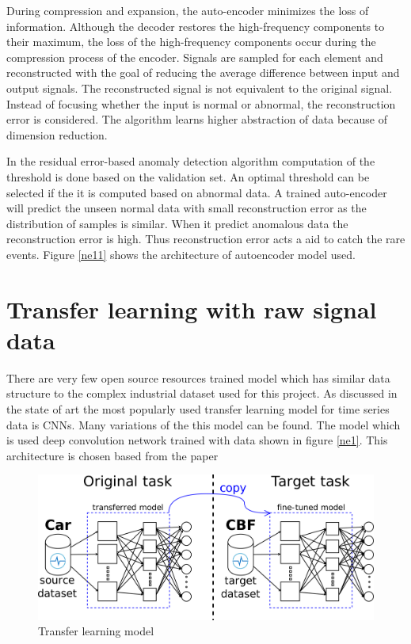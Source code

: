     
    During compression and expansion, the auto-encoder minimizes the loss of information. Although the decoder restores the high-frequency components to their maximum, the loss of the high-frequency components occur during the compression process of the encoder. Signals are sampled for each element and reconstructed with the goal of reducing the average difference between input and output signals. The reconstructed signal is not equivalent to the original signal. Instead of focusing whether the input is normal or abnormal, the reconstruction error is considered. The algorithm learns higher abstraction of data because of dimension reduction.
    
    In the residual error-based anomaly detection algorithm computation of the threshold is done based on the validation set. An optimal threshold can be selected if the it is computed based on abnormal data. A trained auto-encoder will predict the unseen normal data with small reconstruction error as the distribution of samples is similar. When it predict anomalous data the reconstruction error is high. Thus reconstruction error acts a aid to catch the rare events. 
    Figure \ref{ne11} shows the architecture of autoencoder model used. 
   
  
  
   \section{Transfer learning with raw signal data}
There are very few open source resources trained model which has similar data structure to the complex industrial dataset used for this project. As discussed in the state of art the most popularly used transfer learning model for time series data is CNNs. Many variations of the this model can be found. The model which is used deep convolution network trained with data shown in figure \ref{ne1}. This architecture is chosen based from the paper \cite{fawaz2018transfer}

  \begin{figure}[h]
  	\centering
  	\includegraphics[width=0.9\linewidth]{images/transferss.png}
  	\caption{Transfer learning model \cite{fawaz2018transfer} }
  	\label{n01}
  \end{figure}
   
